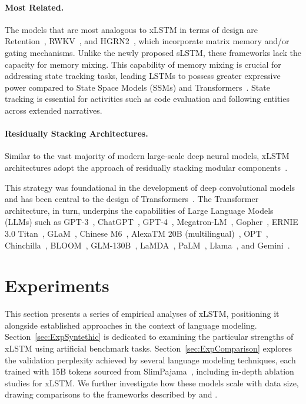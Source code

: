 \paragraph{Most Related.} The models that are most analogous to xLSTM in terms of design are Retention~\citep{Sun:23arxiv}, RWKV~\citep{Peng:23arxivshort,Peng:24arxivshort}, and HGRN2~\citep{Qin:24arxiv}, which incorporate matrix memory and/or gating mechanisms. Unlike the newly proposed sLSTM, these frameworks lack the capacity for memory mixing. This capability of memory mixing is crucial for addressing state tracking tasks, leading LSTMs to possess greater expressive power compared to State Space Models (SSMs) and Transformers~\citep{Merrill:24,Deletang:23}. State tracking is essential for activities such as code evaluation and following entities across extended narratives.

\paragraph{Residually Stacking Architectures.} Similar to the vast majority of modern large-scale deep neural models, xLSTM architectures adopt the approach of residually stacking modular components~\citep{Srivastava:15,He:16}.

This strategy was foundational in the development of deep convolutional models~\citep{He:16} and has been central to the design of Transformers~\citep{Vaswani:17}. The Transformer architecture, in turn, underpins the capabilities of Large Language Models (LLMs) such as GPT-3~\citep{Brown:20short}, ChatGPT~\citep{Schulman:22short}, GPT-4~\citep{Achiam:23gpt4short}, Megatron-LM~\citep{Shoeybi:19}, Gopher~\citep{Rae:21short}, ERNIE 3.0 Titan~\citep{Wang:21arxivshort}, GLaM~\citep{Du:21glamshort}, Chinese M6~\citep{Lin:21}, AlexaTM 20B (multilingual)~\citep{Soltan:22}, OPT~\citep{Zhang:22opt}, Chinchilla~\citep{Hoffmann:22short}, BLOOM~\citep{Scao:22arxivshort}, GLM-130B~\citep{Zeng:22arxivshort}, LaMDA~\citep{Thoppilan:22short}, PaLM~\citep{Chowdhery:22short}, Llama~\citep{Touvron:23arxiv}, and Gemini~\citep{GeminiTeam:23arxiv,Reid:24arxiv}.

\section{Experiments}
\label{sec:Exp}

This section presents a series of empirical analyses of xLSTM, positioning it alongside established approaches in the context of language modeling. Section~\ref{sec:ExpSyntethic} is dedicated to examining the particular strengths of xLSTM using artificial benchmark tasks. Section~\ref{sec:ExpComparison} explores the validation perplexity achieved by several language modeling techniques, each trained with 15B tokens sourced from SlimPajama~\citep{Soboleva:23}, including in-depth ablation studies for xLSTM. We further investigate how these models scale with data size, drawing comparisons to the frameworks described by \citet{Kaplan:20} and \citet{Brown:20short}. 

